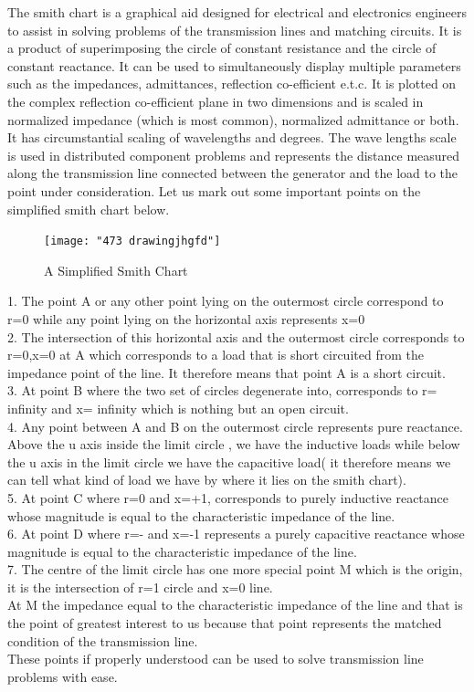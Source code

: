 The smith chart is a graphical aid designed for electrical and electronics engineers to assist in solving problems of the transmission lines and matching circuits. It is a product of superimposing the circle of constant resistance and the circle of constant reactance. It can be used to simultaneously display multiple parameters such as the impedances, admittances, reflection co-efficient e.t.c.
It is plotted on the complex reflection co-efficient plane in two dimensions and is scaled in normalized impedance (which is most common), normalized admittance or both. It has circumstantial scaling of wavelengths and degrees. The wave lengths scale is used in distributed component problems and represents the distance measured along the transmission line connected between the generator and the load to the point under consideration.
Let us mark out some important points on the simplified smith chart below.
\\
\begin{figure}[h]
\centering
\texttt{[image: "473 drawingjhgfd"]}
\caption{A Simplified Smith Chart}
\label{fig:473-drawingjhgfd}
\end{figure}

1.	The point A or any other point lying on the outermost circle correspond to r=0 while any point lying on the horizontal axis represents x=0\\
2.	The intersection of this horizontal axis and the outermost circle corresponds to r=0,x=0 at A which corresponds to a load that is short circuited from the impedance point of the line. It therefore means that point A is a short circuit.\\
3.	At point B where the two set of circles degenerate into, corresponds to r= infinity and x= infinity which is nothing but an open circuit.\\  
4.	Any point between A and B on the outermost circle represents pure reactance. Above the u axis inside the limit circle , we have the inductive loads while below the u axis in the limit circle we have the capacitive load( it therefore means we can tell what kind of load we have by where it lies on the smith chart).\\
5.	At point C where r=0 and x=+1, corresponds to purely inductive reactance whose magnitude is equal to the characteristic impedance of the line.\\
6.	At point D where r=- and x=-1 represents a purely capacitive reactance whose magnitude is equal to the characteristic impedance of the line.\\
7.	The centre of the limit circle has one more special point M which is the origin, it is the intersection of r=1 circle and x=0 line.\\ At M the impedance equal to the characteristic impedance of the line and that is the point of greatest interest to us because that point represents the matched condition of the transmission line.\\
These points if properly understood can be used to solve transmission line problems with ease.

